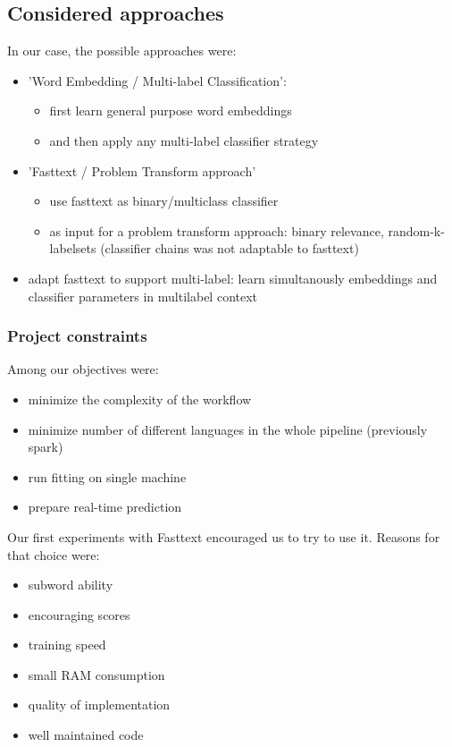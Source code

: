 \subsection{Considered approaches}

In our case, the possible approaches were:
\begin{itemize}
	\item 'Word Embedding / Multi-label Classification':
	\begin{itemize}
		\item first learn general purpose word embeddings
		\item and then apply any multi-label classifier strategy
	\end{itemize}
	\item 'Fasttext / Problem Transform approach'
	\begin{itemize}
		\item use fasttext as binary/multiclass classifier
		\item as input for a problem transform approach: binary relevance, random-k-labelsets (classifier chains was not adaptable to fasttext)
	\end{itemize}
	\item adapt fasttext to support multi-label: learn simultanously embeddings and classifier parameters in multilabel context
\end{itemize}

\subsubsection{Project constraints}

Among our objectives were:
\begin{itemize}
	\item minimize the complexity of the workflow
	\item minimize number of different languages in the whole pipeline (previously spark)
	\item run fitting on single machine
	\item prepare real-time prediction
\end{itemize}

Our first experiments with Fasttext encouraged us to try to use it. Reasons for that choice were:
\begin{itemize}
	\item subword ability
	\item encouraging scores
	\item training speed
	\item small RAM consumption
	\item quality of implementation
	\item well maintained code
\end{itemize}

